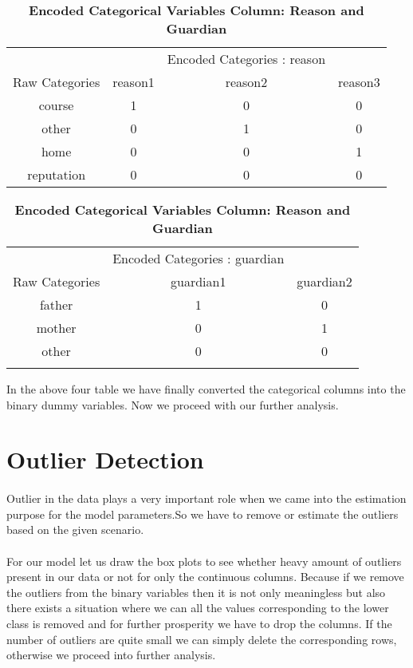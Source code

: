 \documentclass[A4paper,11pt]{report}
\begin{document}
	\begin{table}[H]
		\caption{\textbf{Encoded Categorical Variables Column: Reason and Guardian}}
		\begin{adjustbox}{width= \textwidth,center = \textwidth}
					\begin{tabular}{|c|c c c |}
				\hline
				& &  Encoded Categories : reason&\\
				\cline{2-4}
				Raw Categories & reason1&	reason2&	reason3\\	
				\hline
				course &1 &0 &0 \\
				other &0 &1 &0 \\
				home &0 &0 &1\\
				reputation &0 &0 &0\\
				\hline
			\end{tabular}
			\begin{tabular}{|c|c c |}
				\hline
				&  Encoded Categories : guardian &\\
				\cline{2-3}
				Raw Categories & guardian1&	guardian2\\	
				\hline
				father &1 &0\\
				mother&0 &1\\
				other &0 &0\\
				      & & \\
				\hline
			\end{tabular}
		\end{adjustbox}
	\end{table}
	\par In the above four table we have finally converted the categorical columns into the binary dummy variables. Now we proceed with our further analysis.
	\section{Outlier Detection}
	\paragraph{}Outlier in the data plays a very important role when we came into the estimation purpose for the model parameters.So we have to remove or estimate the outliers based on the given scenario.
	\paragraph{}For our model let us draw the box plots to see whether heavy amount of outliers present in our data or not for only the continuous columns. Because if we remove the outliers from the binary variables then it is not only meaningless but also there exists a situation where we can all the values corresponding to the lower class is removed and for further prosperity we have to drop the columns. If the number of outliers are quite small we can simply delete the corresponding rows, otherwise we proceed into further analysis. 
\end{document}
